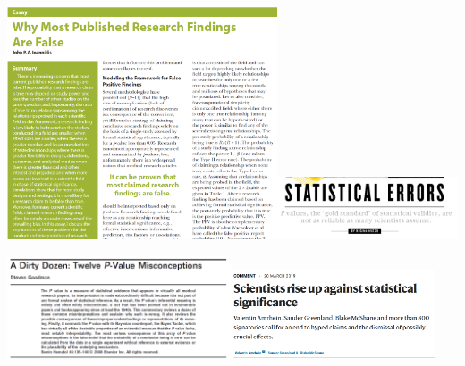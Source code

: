 \documentclass[
  10pt,
  ignorenonframetext,
]{beamer}
\begin{document}
\begin{frame}
\includegraphics[width=0.6\textwidth,height=\textheight]{graphics/Ioannidis2.png}\includegraphics[width=0.4\textwidth,height=\textheight]{graphics/nuzzo.png}

\includegraphics[width=0.5\textwidth,height=\textheight]{graphics/dirtydozen.png}\includegraphics[width=0.45\textwidth,height=\textheight]{graphics/against_ss.png}
\end{frame}
\end{document}
